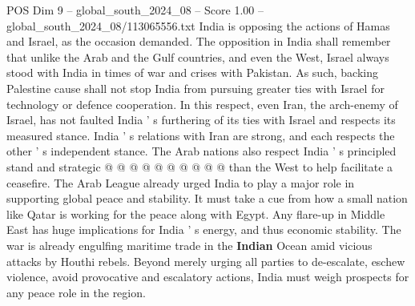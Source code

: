 \begin{textsample}{POS Dim 9 – global\_south\_2024\_08 – Score 1.00 – global\_south\_2024\_08/113065556.txt}
India is opposing the actions of Hamas and Israel, as the occasion demanded.
The opposition in India shall remember that unlike the Arab and the Gulf countries, and even the West, Israel always stood with India in times of war and crises with Pakistan.
As such, backing Palestine cause shall not stop India from pursuing greater ties with Israel for technology or defence cooperation.
In this respect, even Iran, the arch-enemy of Israel, has not faulted India ' s furthering of its ties with Israel and respects its measured stance.
India ' s relations with Iran are strong, and each respects the other ' s independent stance.
The Arab nations also respect India ' s principled stand and strategic @ @ @ @ @ @ @ @ @ @ than the West to help facilitate a ceasefire.
The Arab League already urged India to play a major role in supporting global peace and stability.
It must take a cue from how a small nation like Qatar is working for the peace along with Egypt.
Any flare-up in Middle East has huge implications for India ' s energy, and thus economic stability.
The war is already engulfing maritime trade in the \textbf{Indian} Ocean amid vicious attacks by Houthi rebels.
Beyond merely urging all parties to de-escalate, eschew violence, avoid provocative and escalatory actions, India must weigh prospects for any peace role in the region.

\end{textsample}
